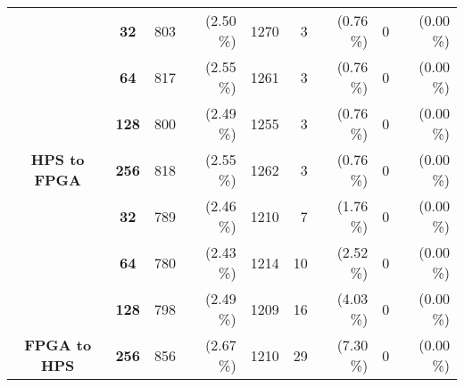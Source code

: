 \begin{table}[htb]
\begin{tabular}{c|c|rr|r|rr|rr|}
\multicolumn{1}{|c|}{}                                                   & \textbf{32}                                                                                    & 803  & \cellcolor[HTML]{C0C0C0}(2.50 \%) & 1270                                    & 3   & \cellcolor[HTML]{C0C0C0}(0.76 \%)   & 0   & \cellcolor[HTML]{C0C0C0}(0.00 \%)  \\ \cline{2-9} 
\multicolumn{1}{|c|}{}                                                   & \textbf{64}                                                                                    & 817  & \cellcolor[HTML]{C0C0C0}(2.55 \%) & 1261                                    & 3   & \cellcolor[HTML]{C0C0C0}(0.76 \%)   & 0   & \cellcolor[HTML]{C0C0C0}(0.00 \%)  \\ \cline{2-9} 
\multicolumn{1}{|c|}{}                                                   & \textbf{128}                                                                                   & 800  & \cellcolor[HTML]{C0C0C0}(2.49 \%) & 1255                                    & 3   & \cellcolor[HTML]{C0C0C0}(0.76 \%)   & 0   & \cellcolor[HTML]{C0C0C0}(0.00 \%)  \\ \cline{2-9} 
\multicolumn{1}{|c|}{\multirow{-4}{*}{\textbf{\acs{HPS} to \acs{FPGA}}}} & \textbf{256}                                                                                   & 818  & \cellcolor[HTML]{C0C0C0}(2.55 \%) & 1262                                    & 3   & \cellcolor[HTML]{C0C0C0}(0.76 \%)   & 0   & \cellcolor[HTML]{C0C0C0}(0.00 \%)  \\ \hline
\multicolumn{1}{|c|}{}                                                   & \textbf{32}                                                                                    & 789  & \cellcolor[HTML]{C0C0C0}(2.46 \%) & 1210                                    & 7   & \cellcolor[HTML]{C0C0C0}(1.76 \%)   & 0   & \cellcolor[HTML]{C0C0C0}(0.00 \%)  \\ \cline{2-9} 
\multicolumn{1}{|c|}{}                                                   & \textbf{64}                                                                                    & 780  & \cellcolor[HTML]{C0C0C0}(2.43 \%) & 1214                                    & 10  & \cellcolor[HTML]{C0C0C0}(2.52 \%)   & 0   & \cellcolor[HTML]{C0C0C0}(0.00 \%)  \\ \cline{2-9} 
\multicolumn{1}{|c|}{}                                                   & \textbf{128}                                                                                   & 798  & \cellcolor[HTML]{C0C0C0}(2.49 \%) & 1209                                    & 16  & \cellcolor[HTML]{C0C0C0}(4.03 \%)   & 0   & \cellcolor[HTML]{C0C0C0}(0.00 \%)  \\ \cline{2-9} 
\multicolumn{1}{|c|}{\multirow{-4}{*}{\textbf{\acs{FPGA} to \acs{HPS}}}} & \textbf{256}                                                                                   & 856  & \cellcolor[HTML]{C0C0C0}(2.67 \%) & 1210                                    & 29  & \cellcolor[HTML]{C0C0C0}(7.30 \%)   & 0   & \cellcolor[HTML]{C0C0C0}(0.00 \%)  \\ \hline
\end{tabular}
\end{table}
